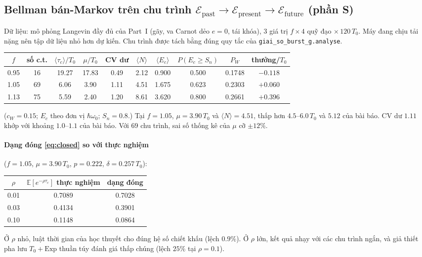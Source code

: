 \documentclass[11pt,a4paper]{article}
\newcommand{\Epast}{\mathcal{E}_{\text{past}}}
\newcommand{\Epres}{\mathcal{E}_{\text{present}}}
\newcommand{\Efut}{\mathcal{E}_{\text{future}}}
\newcommand{\E}{\mathbb{E}}
\theoremstyle{remark}
\begin{document}
\subsection{Bellman bán-Markov trên chu trình $\Epast\to\Epres\to\Efut$ (phần S)}
Dữ liệu: mô phỏng Langevin đầy đủ của Part~I (gãy, va Carnot dẻo $e=0$, tái khóa), $3$ giá trị $f\times4$ quỹ đạo $\times\,120\,T_0$. Máy đang chịu tải nặng nên tập dữ liệu nhỏ hơn dự kiến. Chu trình được tách bằng đúng quy tắc của \texttt{giai\_so\_burst\_g.analyse}.

\begin{center}\small\setlength{\tabcolsep}{4pt}
\begin{tabular}{cccccccccc}
\toprule
$f$ & số c.t. & $\langle\tau_c\rangle/T_0$ & $\mu/T_0$ & CV dư & $\langle N\rangle$ & $\langle E_c\rangle$ & $P(E_c\ge S_n)$ & $P_W$ & thưởng/$T_0$\\
\midrule
0.95 & 16 & 19.27 & 17.83 & 0.49 & 2.12 & 0.900 & 0.500 & 0.1748 & $-0.118$\\
1.05 & 69 & 6.06 & 3.90 & 1.11 & 4.51 & 1.675 & 0.623 & 0.2303 & $+0.060$\\
1.13 & 75 & 5.59 & 2.40 & 1.20 & 8.61 & 3.620 & 0.800 & 0.2661 & $+0.396$\\
\bottomrule
\end{tabular}
\end{center}
($c_W=0.15$; $E_c$ theo đơn vị $\hbar\omega_0$; $S_n=0.8$.) Tại $f=1.05$, $\mu=3.90\,T_0$ và $\langle N\rangle=4.51$, thấp hơn $4.5$--$6.0\,T_0$ và $5.12$ của bài báo. CV dư $1.11$ khớp với khoảng $1.0$--$1.1$ của bài báo. Với $69$ chu trình, sai số thống kê của $\mu$ cỡ $\pm12\%$.

\paragraph{Dạng đóng \eqref{eq:closed} so với thực nghiệm} ($f=1.05$, $\mu=3.90\,T_0$, $p=0.222$, $\delta=0.257\,T_0$):
\begin{center}
\begin{tabular}{ccc}
\toprule
$\rho$ & $\E[e^{-\rho\tau_c}]$ thực nghiệm & dạng đóng\\
\midrule
0.01 & 0.7089 & 0.7028\\
0.03 & 0.4134 & 0.3901\\
0.10 & 0.1148 & 0.0864\\
\bottomrule
\end{tabular}
\end{center}
Ở $\rho$ nhỏ, luật thời gian của học thuyết cho đúng hệ số chiết khấu (lệch $0.9\%$). Ở $\rho$ lớn, kết quả nhạy với các chu trình ngắn, và giả thiết pha lưu $T_0+\mathrm{Exp}$ thuần túy đánh giá thấp chúng (lệch $25\%$ tại $\rho=0.1$).
\end{document}
